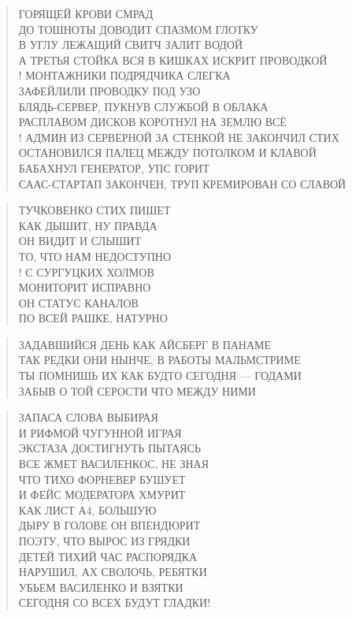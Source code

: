 \poemtitle{***}
\begin{verse}
ГОРЯЩЕЙ КРОВИ СМРАД \\
ДО ТОШНОТЫ ДОВОДИТ СПАЗМОМ ГЛОТКУ\\
В УГЛУ ЛЕЖАЩИЙ СВИТЧ ЗАЛИТ ВОДОЙ\\
А ТРЕТЬЯ СТОЙКА ВСЯ В КИШКАХ ИСКРИТ ПРОВОДКОЙ\\!
МОНТАЖНИКИ ПОДРЯДЧИКА СЛЕГКА\\
ЗАФЕЙЛИЛИ ПРОВОДКУ ПОД УЗО\\
БЛЯДЬ-СЕРВЕР, ПУКНУВ СЛУЖБОЙ В ОБЛАКА\\
РАСПЛАВОМ ДИСКОВ КОРОТНУЛ НА ЗЕМЛЮ ВСЁ\\!
АДМИН ИЗ СЕРВЕРНОЙ ЗА СТЕНКОЙ НЕ ЗАКОНЧИЛ СТИХ\\
ОСТАНОВИЛСЯ ПАЛЕЦ МЕЖДУ ПОТОЛКОМ И КЛАВОЙ\\
БАБАХНУЛ ГЕНЕРАТОР, УПС ГОРИТ\\
СААС-СТАРТАП ЗАКОНЧЕН, ТРУП КРЕМИРОВАН СО СЛАВОЙ
\end{verse}

\poemtitle{***}
\begin{verse}
ТУЧКОВЕНКО СТИХ ПИШЕТ\\
КАК ДЫШИТ, НУ ПРАВДА\\
ОН ВИДИТ И СЛЫШИТ\\
ТО, ЧТО НАМ НЕДОСТУПНО\\!
С СУРГУЦКИХ ХОЛМОВ\\
МОНИТОРИТ ИСПРАВНО\\
ОН СТАТУС КАНАЛОВ \\
ПО ВСЕЙ РАШКЕ, НАТУРНО
\end{verse}

\poemtitle{***}
\begin{verse}
ЗАДАВШИЙСЯ ДЕНЬ КАК АЙСБЕРГ В ПАНАМЕ\\
ТАК РЕДКИ ОНИ НЫНЧЕ, В РАБОТЫ МАЛЬМСТРИМЕ\\
ТЫ ПОМНИШЬ ИХ КАК БУДТО СЕГОДНЯ — ГОДАМИ\\
ЗАБЫВ О ТОЙ СЕРОСТИ ЧТО МЕЖДУ НИМИ
\end{verse}

\poemtitle{***}
\begin{verse}
ЗАПАСА СЛОВА ВЫБИРАЯ\\
И РИФМОЙ ЧУГУННОЙ ИГРАЯ\\
ЭКСТАЗА ДОСТИГНУТЬ ПЫТАЯСЬ\\
ВСЕ ЖМЕТ ВАСИЛЕНКОС, НЕ ЗНАЯ\\
ЧТО ТИХО ФОРНЕВЕР БУШУЕТ\\
И ФЕЙС МОДЕРАТОРА ХМУРИТ\\
КАК ЛИСТ А4, БОЛЬШУЮ\\
ДЫРУ В ГОЛОВЕ ОН ВПЕНДЮРИТ\\
ПОЭТУ, ЧТО ВЫРОС ИЗ ГРЯДКИ\\
ДЕТЕЙ ТИХИЙ ЧАС РАСПОРЯДКА\\
НАРУШИЛ, АХ СВОЛОЧЬ, РЕБЯТКИ\\
УБЬЕМ ВАСИЛЕНКО И ВЗЯТКИ\\
СЕГОДНЯ СО ВСЕХ БУДУТ ГЛАДКИ!
\end{verse}

